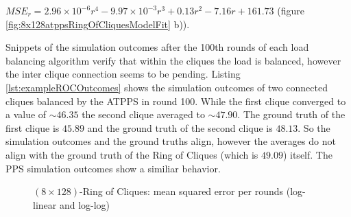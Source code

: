 $MSE_r=2.96 \times 10^{-6}r^{4}-9.97\times 10^{-3}r^{3}+0.13r^{2}-7.16r+161.73$ (figure \ref{fig:8x128atppsRingOfCliquesModelFit} b)).

Snippets of the simulation outcomes after the 100th rounds of each load balancing algorithm verify that within the cliques the load is balanced, however the inter clique connection seems to be pending. Listing \ref{lst:exampleROCOutcomes} shows the simulation outcomes of two connected cliques balanced by the ATPPS in round 100. While the first clique converged to a value of $\sim 46.35$ the second clique averaged to $\sim 47.90$. The ground truth of the first clique is $45.89$ and the ground truth of the second clique is $48.13$. So the simulation outcomes and the ground truths align, however the averages do not align with the ground truth of the Ring of Cliques (which is $49.09$) itself. The PPS simulation outcomes show a similiar behavior.
\begin{figure}[!ht]
    \centering
    \hfil
    \caption{$(8\times128)$-Ring of Cliques: mean squared error per rounds (log-linear and log-log)}
        \label{fig:128x8RingOfCliquesLog_LogLog}
\end{figure}

